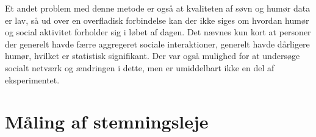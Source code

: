 Et andet problem med denne metode er også at kvaliteten af søvn og humør data er lav, så ud over en overfladisk forbindelse kan der ikke siges om hvordan humør og social aktivitet forholder sig i løbet af dagen.
Det nævnes kun kort at personer der generelt havde færre aggregeret sociale interaktioner, generelt havde dårligere humør, hvilket er statistisk signifikant.
Der var også mulighed for at undersøge socialt netværk og ændringen i dette, men er umiddelbart ikke en del af eksperimentet.

\section{Måling af stemningsleje}\label{maaling_af_stemningsleje}







